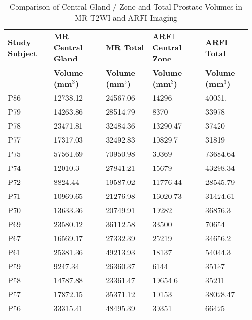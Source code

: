 \begin{table}
\centering
\caption{Comparison of Central Gland / Zone and Total Prostate Volumes in MR T2WI and ARFI Imaging}
\begin{tabular}{|l|l|l|l|l|} \hline
{\bf Study Subject} & {\bf MR Central Gland} & {\bf MR Total} & {\bf ARFI Central Zone} & {\bf ARFI Total} \\ 
& {\bf Volume (mm$^3$)} & {\bf Volume (mm$^3$)} & {\bf Volume (mm$^3$)} & {\bf Volume (mm$^3$)} \\ \hline
P86 & 12738.12 & 24567.06 & 14296. & 40031. \\
P79 & 14263.86 & 28514.79 & 8370 & 33978 \\
P78 & 23471.81 & 32484.36 & 13290.47 & 37420 \\
P77 & 17317.03 & 32492.83 & 10829.7 & 31819 \\
P75 & 57561.69 & 70950.98 & 30369 & 73684.64 \\
P74 & 12010.3 & 27841.21 & 15679 & 43298.34 \\
P72 & 8824.44 & 19587.02 & 11776.44 & 28545.79 \\
P71 & 10969.65 & 21276.98 & 16020.73 & 31424.61 \\
P70 & 13633.36 & 20749.91 & 19282 & 36876.3\\
P69 & 23580.12 & 36112.58 & 33500 & 70654 \\
P67 & 16569.17 & 27332.39 & 25219 & 34656.2 \\
P61 & 25381.36 & 49213.93 & 18137 & 54044.3 \\
P59 & 9247.34 & 26360.37 & 6144 & 35137 \\
P58 & 14787.88 & 23361.47 & 19654.6 & 35211 \\
P57 & 17872.15 & 35371.12 & 10153 & 38028.47 \\
P56 & 33315.41 & 48495.39 & 39351 & 66425 \\ \hline
\end{tabular}
\label{tab:mr_arfi_volumes}
\end{table}

